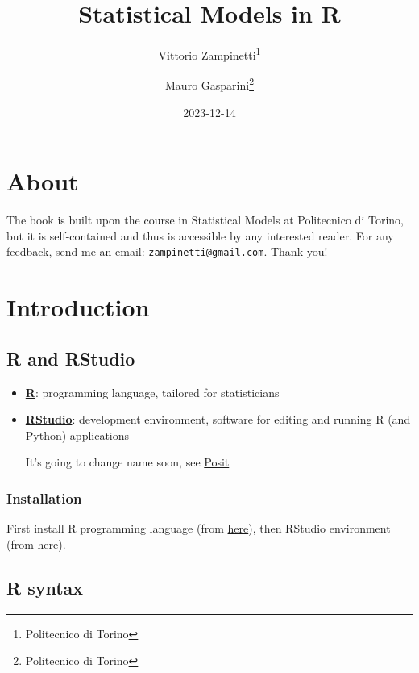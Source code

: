 \documentclass[
  oneside]{book}
\title{Statistical Models in R}
\author{Vittorio Zampinetti\footnote{Politecnico di Torino} \and Mauro Gasparini\footnote{Politecnico di Torino}}
\date{2023-12-14}
\begin{document}
\maketitle

{
\setcounter{tocdepth}{2}
\tableofcontents
}
\hypertarget{about}{%
\chapter*{About}\label{about}}

The book is built upon the course in Statistical Models at
Politecnico di Torino, but it is self-contained and thus is
accessible by any interested reader. For any feedback, send me
an email: \href{mailto:zampinetti@gmail.com}{\nolinkurl{zampinetti@gmail.com}}. Thank you!

\hypertarget{introduction}{%
\chapter{Introduction}\label{introduction}}

\hypertarget{r-and-rstudio}{%
\section{R and RStudio}\label{r-and-rstudio}}

\begin{itemize}
\item
  \href{https://www.r-project.org/}{\textbf{R}}: programming language, tailored for
  statisticians
\item
  \href{https://www.rstudio.com/}{\textbf{RStudio}}: development environment, software for
  editing and running R (and Python) applications

  It's going to change name soon, see \href{https://posit.co/}{Posit}
\end{itemize}

\hypertarget{installation}{%
\subsection{Installation}\label{installation}}

First install R programming language (from \href{https://cran.rstudio.com/}{here}),
then RStudio environment (from
\href{https://www.rstudio.com/products/rstudio/download/\#download}{here}).

\hypertarget{r-syntax}{%
\section{R syntax}\label{r-syntax}}
\end{document}
